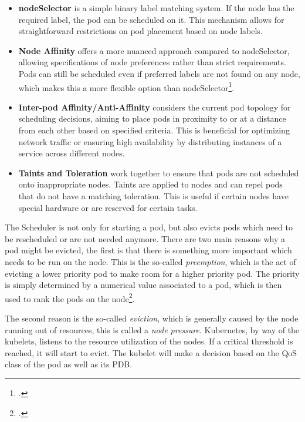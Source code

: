 \begin{itemize}
    \item \textbf{nodeSelector} is a simple binary label matching system. If the node has the required label, the pod can be scheduled on it. This mechanism allows for straightforward restrictions on pod placement based on node labels.
    \item \textbf{Node Affinity} offers a more nuanced approach compared to nodeSelector, allowing specifications of node preferences rather than strict requirements. Pods can still be scheduled even if preferred labels are not found on any node, which makes this a more flexible option than nodeSelector\footcite{kubernetes-docsAssigningPodsNodes}.
    \item \textbf{Inter-pod Affinity/Anti-Affinity} considers the current pod topology for scheduling decisions, aiming to place pods in proximity to or at a distance from each other based on specified criteria. This is beneficial for optimizing network traffic or ensuring high availability by distributing instances of a service across different nodes.
    \item \textbf{Taints and Toleration} work together to ensure that pods are not scheduled onto inappropriate nodes. Taints are applied to nodes and can repel pods that do not have a matching toleration. This is useful if certain nodes have special hardware or are reserved for certain tasks.
\end{itemize}

The Scheduler is not only for starting a pod, but also evicts pods which need to be rescheduled or are not needed anymore.
There are two main reasons why a pod might be evicted, the first is that there is something more important which needs to be run on the node.
This is the so-called \textit{preemption}, which is the act of evicting a lower priority pod to make room for a higher priority pod.
The priority is simply determined by a numerical value associated to a pod, which is then used to rank the pods on the node\footcite{martinezUnderstandingKubernetesEvicted2022}.

The second reason is the so-called \textit{eviction}, which is generally caused by the node running out of resources,
this is called a \textit{node pressure}.
Kubernetes, by way of the kubelets, listens to the resource utilization of the nodes. If a critical threshold is reached,
it will start to evict. The kubelet will make a decision based on the \ac{QoS} class of the pod as well as its \ac{PDB}.

